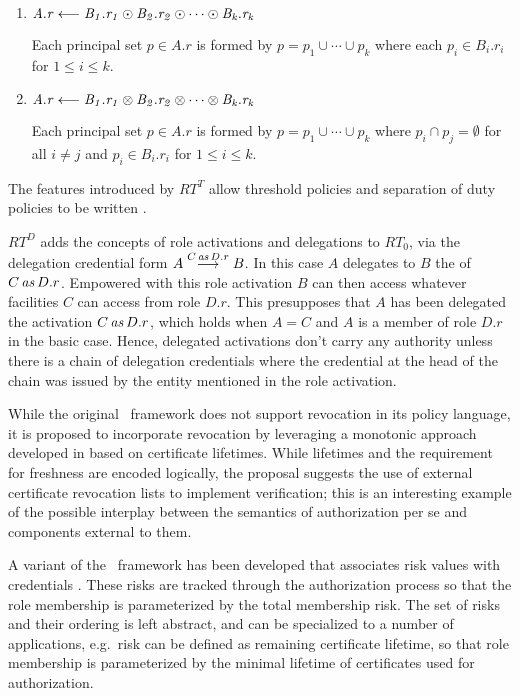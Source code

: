\begin{enumerate}

\item $\cred{A.r}{B_1.r_1 \odot B_2.r_2 \odot \cdots \odot B_k.r_k}{}$ 

  Each principal set $p \in A.r$ is formed by $p = p_1 \cup \cdots \cup p_k$ where each $p_i \in
  B_i.r_i$ for $1 \le i \le k$.

\item $\cred{A.r}{B_1.r_1 \otimes B_2.r_2 \otimes \cdots \otimes B_k.r_k}{}$ 

  Each principal set $p \in A.r$ is formed by $p = p_1 \cup \cdots \cup p_k$ where $p_i \cap p_j
  = \emptyset$ for all $i \ne j$ and $p_i \in B_i.r_i$ for $1 \le i \le k$.

\end{enumerate}

The features introduced by $RT^T$ allow threshold policies and separation of duty policies to
be written \cite{Li:DRBTMF}.

$RT^D$ adds the concepts of role activations and delegations to $RT_0$, via the delegation
credential form $\delcred{A}{B}{\activation{C}{D.r}}$. In this case $A$ delegates to $B$ the
 of $\activation{C}{D.r}$. Empowered with this role activation $B$ can
then access whatever facilities $C$ can access from role $D.r$. This presupposes that $A$ has
been delegated the activation $\activation{C}{D.r}$, which holds when $A = C$ and $A$ is a
member of role $D.r$ in the basic case. Hence, delegated activations don't carry any authority
unless there is a chain of delegation credentials where the credential at the head of the chain
was issued by the entity mentioned in the role activation.

While the original \RT\ framework does not support revocation in its policy language, it is
proposed to incorporate revocation \cite{Li:DRBTMF} by leveraging a monotonic approach developed
in \cite{lbi-fc01} based on certificate lifetimes. While lifetimes and the requirement for
freshness are encoded logically, the proposal suggests the use of external certificate
revocation lists to implement verification; this is an interesting example of the possible
interplay between the semantics of authorization per se and components external to them.

A variant of the \RT\ framework has been developed that associates risk values with credentials
\cite{skalka-wang-chapin-jcs06}. These risks are tracked through the authorization process so
that the role membership is parameterized by the total membership risk. The set of risks and
their ordering is left abstract, and can be specialized to a number of applications, e.g.~risk
can be defined as remaining certificate lifetime, so that role membership is parameterized by
the minimal lifetime of certificates used for authorization.

